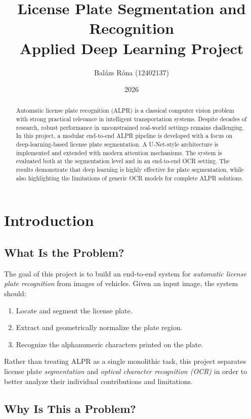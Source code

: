 \documentclass[11pt,a4paper]{article}
\title{License Plate Segmentation and Recognition \\ Applied Deep Learning Project}
\author{Balázs Róna (12402137)}
\date{2026}
\begin{document}
\maketitle

\begin{abstract}
Automatic license plate recognition (ALPR) is a classical computer vision problem with strong practical relevance in intelligent transportation systems. Despite decades of research, robust performance in unconstrained real-world settings remains challenging. In this project, a modular end-to-end ALPR pipeline is developed with a focus on deep-learning-based license plate segmentation. A U-Net-style architecture is implemented and extended with modern attention mechanisms. The system is evaluated both at the segmentation level and in an end-to-end OCR setting. The results demonstrate that deep learning is highly effective for plate segmentation, while also highlighting the limitations of generic OCR models for complete ALPR solutions.
\end{abstract}

\tableofcontents

\section{Introduction}

\subsection{What Is the Problem?}

The goal of this project is to build an end-to-end system for \emph{automatic license plate recognition} from images of vehicles. Given an input image, the system should:
\begin{enumerate}[label=(\roman*)]
    \item Locate and segment the license plate.
    \item Extract and geometrically normalize the plate region.
    \item Recognize the alphanumeric characters printed on the plate.
\end{enumerate}

Rather than treating ALPR as a single monolithic task, this project separates license plate \emph{segmentation} and \emph{optical character recognition (OCR)} in order to better analyze their individual contributions and limitations.

\subsection{Why Is This a Problem?}
\end{document}
